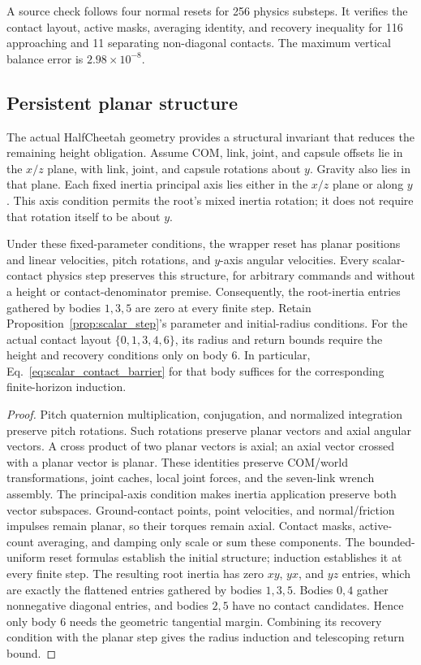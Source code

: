 A source check follows four normal resets for 256 physics substeps.
It verifies the contact layout, active masks, averaging identity, and recovery inequality for 116 approaching and 11 separating non-diagonal contacts.
The maximum vertical balance error is $2.98\times10^{-8}$.

\subsection{Persistent planar structure}
\label{app:planar_structure}

The actual HalfCheetah geometry provides a structural invariant that reduces the remaining height obligation.
Assume COM, link, joint, and capsule offsets lie in the $x/z$ plane, with link, joint, and capsule rotations about $y$.
Gravity also lies in that plane.
Each fixed inertia principal axis lies either in the $x/z$ plane or along $y$.
This axis condition permits the root's mixed inertia rotation; it does not require that rotation itself to be about $y$.

\begin{proposition}
\label{prop:planar_structure}
Under these fixed-parameter conditions, the wrapper reset has planar positions and linear velocities, pitch rotations, and $y$-axis angular velocities.
Every scalar-contact physics step preserves this structure, for arbitrary commands and without a height or contact-denominator premise.
Consequently, the root-inertia entries gathered by bodies $1,3,5$ are zero at every finite step.
Retain Proposition~\ref{prop:scalar_step}'s parameter and initial-radius conditions.
For the actual contact layout $\{0,1,3,4,6\}$, its radius and return bounds require the height and recovery conditions only on body $6$.
In particular, Eq.~\eqref{eq:scalar_contact_barrier} for that body suffices for the corresponding finite-horizon induction.
\end{proposition}

\begin{proof}
Pitch quaternion multiplication, conjugation, and normalized integration preserve pitch rotations.
Such rotations preserve planar vectors and axial angular vectors.
A cross product of two planar vectors is axial; an axial vector crossed with a planar vector is planar.
These identities preserve COM/world transformations, joint caches, local joint forces, and the seven-link wrench assembly.
The principal-axis condition makes inertia application preserve both vector subspaces.
Ground-contact points, point velocities, and normal/friction impulses remain planar, so their torques remain axial.
Contact masks, active-count averaging, and damping only scale or sum these components.
The bounded-uniform reset formulas establish the initial structure; induction establishes it at every finite step.
The resulting root inertia has zero $xy$, $yx$, and $yz$ entries, which are exactly the flattened entries gathered by bodies $1,3,5$.
Bodies $0,4$ gather nonnegative diagonal entries, and bodies $2,5$ have no contact candidates.
Hence only body $6$ needs the geometric tangential margin.
Combining its recovery condition with the planar step gives the radius induction and telescoping return bound.
\end{proof}

